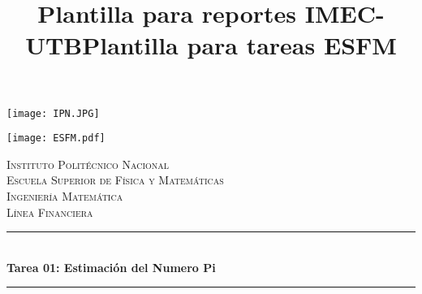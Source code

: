 \documentclass[10pt]{article}\usepackage[]{graphicx}\usepackage[]{color}
\title{Plantilla para reportes IMEC-UTB}
\title{Plantilla para tareas ESFM}
\begin{document}
\begin{center}																		%
\newcommand{\HRule}{\rule{\linewidth}{0.5mm}}									%
\begin{minipage}{0.48\textwidth} \begin{flushleft}
\texttt{[image: IPN.JPG]}
\end{flushleft}\end{minipage}
\begin{minipage}{0.48\textwidth} \begin{flushright}
\texttt{[image: ESFM.pdf]}
\end{flushright}\end{minipage}

\vspace*{1.0cm}								%
\textsc{\huge Instituto Politécnico Nacional \\ \vspace{5px} Escuela Superior de Física y Matemáticas}\\[1.5cm]	

\textsc{\LARGE  Ingeniería Matemática \\ \vspace{5px} Línea Financiera }\\[1.5cm]													%


 			\vspace*{1cm}																		%
\HRule \\[0.4cm]																	%
{ \huge \bfseries Tarea 01: Estimación del Numero Pi}\\[0.4cm]	%
\HRule \\[1 cm]																	%
\begin{minipage}{0.46\textwidth}													%
\begin{flushleft} \large															%


\end{flushleft}
\end{minipage}
\end{center}
\end{document}
